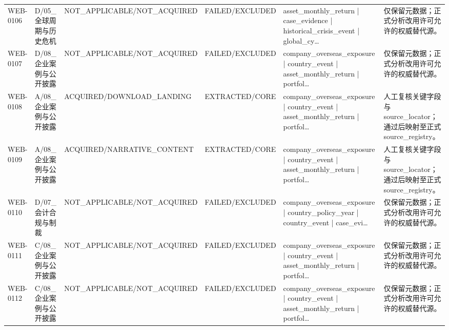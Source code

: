 \begin{landscape}
\begin{longtable}{p{1.8cm}p{2.6cm}p{2.6cm}p{2.6cm}p{4.8cm}p{7.2cm}}
WEB-0106 & D/\allowbreak{}05\_\allowbreak{}全球周期与历史危机 & NOT\_\allowbreak{}APPLICABLE/\allowbreak{}NOT\_\allowbreak{}ACQUIRED & FAILED/\allowbreak{}EXCLUDED & asset\_\allowbreak{}monthly\_\allowbreak{}return | case\_\allowbreak{}evidence | historical\_\allowbreak{}crisis\_\allowbreak{}event | global\_\allowbreak{}cy… & 仅保留元数据；正式分析改用许可允许的权威替代源。\\
WEB-0107 & D/\allowbreak{}08\_\allowbreak{}企业案例与公开披露 & NOT\_\allowbreak{}APPLICABLE/\allowbreak{}NOT\_\allowbreak{}ACQUIRED & FAILED/\allowbreak{}EXCLUDED & company\_\allowbreak{}overseas\_\allowbreak{}exposure | country\_\allowbreak{}event | asset\_\allowbreak{}monthly\_\allowbreak{}return | portfol… & 仅保留元数据；正式分析改用许可允许的权威替代源。\\
WEB-0108 & A/\allowbreak{}08\_\allowbreak{}企业案例与公开披露 & ACQUIRED/\allowbreak{}DOWNLOAD\_\allowbreak{}LANDING & EXTRACTED/\allowbreak{}CORE & company\_\allowbreak{}overseas\_\allowbreak{}exposure | country\_\allowbreak{}event | asset\_\allowbreak{}monthly\_\allowbreak{}return | portfol… & 人工复核关键字段与source\_\allowbreak{}locator；通过后映射至正式source\_\allowbreak{}registry。\\
WEB-0109 & A/\allowbreak{}08\_\allowbreak{}企业案例与公开披露 & ACQUIRED/\allowbreak{}NARRATIVE\_\allowbreak{}CONTENT & EXTRACTED/\allowbreak{}CORE & company\_\allowbreak{}overseas\_\allowbreak{}exposure | country\_\allowbreak{}event | asset\_\allowbreak{}monthly\_\allowbreak{}return | portfol… & 人工复核关键字段与source\_\allowbreak{}locator；通过后映射至正式source\_\allowbreak{}registry。\\
WEB-0110 & D/\allowbreak{}07\_\allowbreak{}会计合规与制裁 & NOT\_\allowbreak{}APPLICABLE/\allowbreak{}NOT\_\allowbreak{}ACQUIRED & FAILED/\allowbreak{}EXCLUDED & company\_\allowbreak{}overseas\_\allowbreak{}exposure | country\_\allowbreak{}policy\_\allowbreak{}year | country\_\allowbreak{}event | case\_\allowbreak{}evi… & 仅保留元数据；正式分析改用许可允许的权威替代源。\\
WEB-0111 & C/\allowbreak{}08\_\allowbreak{}企业案例与公开披露 & NOT\_\allowbreak{}APPLICABLE/\allowbreak{}NOT\_\allowbreak{}ACQUIRED & FAILED/\allowbreak{}EXCLUDED & company\_\allowbreak{}overseas\_\allowbreak{}exposure | country\_\allowbreak{}event | asset\_\allowbreak{}monthly\_\allowbreak{}return | portfol… & 仅保留元数据；正式分析改用许可允许的权威替代源。\\
WEB-0112 & C/\allowbreak{}08\_\allowbreak{}企业案例与公开披露 & NOT\_\allowbreak{}APPLICABLE/\allowbreak{}NOT\_\allowbreak{}ACQUIRED & FAILED/\allowbreak{}EXCLUDED & company\_\allowbreak{}overseas\_\allowbreak{}exposure | country\_\allowbreak{}event | asset\_\allowbreak{}monthly\_\allowbreak{}return | portfol… & 仅保留元数据；正式分析改用许可允许的权威替代源。\\

\end{longtable}
\end{landscape}
